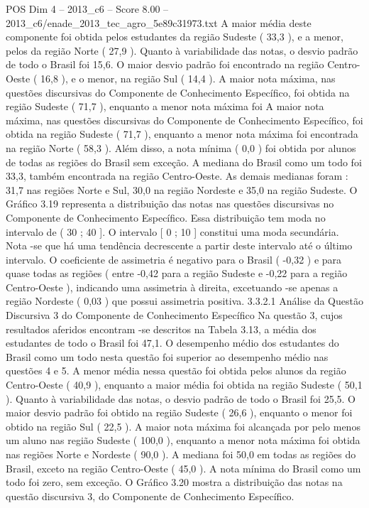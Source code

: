 \begin{textsample}{POS Dim 4 – 2013\_c6 – Score 8.00 – 2013\_c6/enade\_2013\_tec\_agro\_5e89c31973.txt}
A maior média deste componente foi obtida pelos estudantes da região Sudeste ( 33,3 ), e a menor, pelos da região Norte ( 27,9 ).
Quanto à variabilidade das notas, o desvio padrão de todo o Brasil foi 15,6.
O maior desvio padrão foi encontrado na região Centro-Oeste ( 16,8 ), e o menor, na região Sul ( 14,4 ).
A maior nota máxima, nas questões discursivas do Componente de Conhecimento Específico, foi obtida na região Sudeste ( 71,7 ), enquanto a menor nota máxima foi A maior nota máxima, nas questões discursivas do Componente de Conhecimento Específico, foi obtida na região Sudeste ( 71,7 ), enquanto a menor nota máxima foi encontrada na região Norte ( 58,3 ).
Além disso, a nota mínima ( 0,0 ) foi obtida por alunos de todas as regiões do Brasil sem exceção.
A mediana do Brasil como um todo foi 33,3, também encontrada na região Centro-Oeste.
As demais medianas foram : 31,7 nas regiões Norte e Sul, 30,0 na região Nordeste e 35,0 na região Sudeste.
O Gráfico 3.19 representa a distribuição das notas nas questões discursivas no Componente de Conhecimento Específico.
Essa distribuição tem moda no intervalo de ( 30 ; 40 ].
O intervalo [ 0 ; 10 ] constitui uma moda secundária.
Nota -se que há uma tendência decrescente a partir deste intervalo até o último intervalo.
O coeficiente de assimetria é negativo para o Brasil ( -0,32 ) e para quase todas as regiões ( entre -0,42 para a região Sudeste e -0,22 para a região Centro-Oeste ), indicando uma assimetria à direita, excetuando -se apenas a região Nordeste ( 0,03 ) que possui assimetria positiva. 3.3.2.1 Análise da Questão Discursiva 3 do Componente de Conhecimento Específico Na questão 3, cujos resultados aferidos encontram -se descritos na Tabela 3.13, a média dos estudantes de todo o Brasil foi 47,1.
O desempenho médio dos estudantes do Brasil como um todo nesta questão foi superior ao desempenho médio nas questões 4 e 5.
A menor média nessa questão foi obtida pelos alunos da região Centro-Oeste ( 40,9 ), enquanto a maior média foi obtida na região Sudeste ( 50,1 ).
Quanto à variabilidade das notas, o desvio padrão de todo o Brasil foi 25,5.
O maior desvio padrão foi obtido na região Sudeste ( 26,6 ), enquanto o menor foi obtido na região Sul ( 22,5 ).
A maior nota máxima foi alcançada por pelo menos um aluno nas região Sudeste ( 100,0 ), enquanto a menor nota máxima foi obtida nas regiões Norte e Nordeste ( 90,0 ).
A mediana foi 50,0 em todas as regiões do Brasil, exceto na região Centro-Oeste ( 45,0 ).
A nota mínima do Brasil como um todo foi zero, sem exceção.
O Gráfico 3.20 mostra a distribuição das notas na questão discursiva 3, do Componente de Conhecimento Específico.

\end{textsample}
